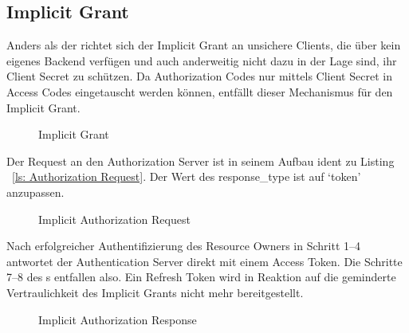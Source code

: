 \subsection{Implicit Grant}\label{ssec:implicit}
Anders als der  richtet sich der Implicit Grant an
unsichere Clients, die über kein eigenes Backend verfügen und auch anderweitig
nicht dazu in der Lage sind, ihr Client Secret zu schützen. Da Authorization
Codes nur mittels Client Secret in Access Codes eingetauscht werden können,
entfällt dieser Mechanismus für den Implicit Grant.

\begin{figure}[h]
    \scalebox{.6} {
        
    }
    \caption{Implicit Grant}\label{fig: Implicit Grant}
\end{figure} \noindent
Der Request an den Authorization Server ist in seinem Aufbau ident zu Listing
~\ref{ls: Authorization Request}. Der Wert des response\_type ist auf `token'
anzupassen.

\begin{figure}[h]
    \scalebox{.8}{
        
    }
    \caption{Implicit Authorization Request}\label{ls: Implicit Authorization Request}
\end{figure} \noindent
Nach erfolgreicher Authentifizierung des Resource Owners in Schritt 1--4
antwortet der Authentication Server direkt mit einem Access Token. Die Schritte
7--8 des s entfallen also. Ein Refresh
Token wird in Reaktion auf die geminderte Vertraulichkeit des Implicit Grants
nicht mehr bereitgestellt.

\begin{figure}[h]
    \scalebox{.8}{
        
    }
    \caption{Implicit Authorization Response}\label{ls: Implicit Authorization Response}
\end{figure}
